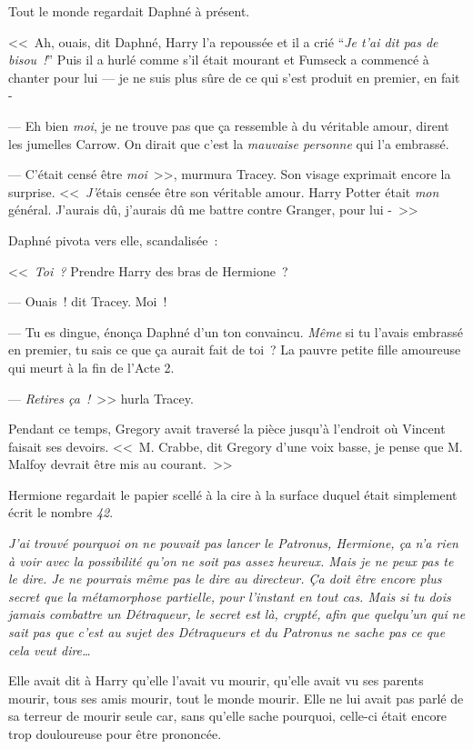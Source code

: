 Tout le monde regardait Daphné à présent.

<<~Ah, ouais, dit Daphné, Harry l'a repoussée et il a crié “\emph{Je t'ai dit pas de bisou~!}” Puis il a hurlé comme s'il était mourant et Fumseck a commencé à chanter pour lui — je ne suis plus sûre de ce qui s'est produit en premier, en fait -

--- Eh bien \emph{moi}, je ne trouve pas que ça ressemble à du véritable amour, dirent les jumelles Carrow. On dirait que c'est la \emph{mauvaise personne} qui l'a embrassé.

--- C'était censé être \emph{moi}~>>, murmura Tracey. Son visage exprimait encore la surprise. <<~\emph{J'}étais censée être son véritable amour. Harry Potter était \emph{mon} général. J'aurais dû, j'aurais dû me battre contre Granger, pour lui -~>>

Daphné pivota vers elle, scandalisée~:

<<~\emph{Toi~?} Prendre Harry des bras de Hermione~?

--- Ouais~! dit Tracey. Moi~!

--- Tu es dingue, énonça Daphné d'un ton convaincu. \emph{Même} si tu l'avais embrassé en premier, tu sais ce que ça aurait fait de toi~? La pauvre petite fille amoureuse qui meurt à la fin de l'Acte 2.

--- \emph{Retires ça~!}~>> hurla Tracey.

Pendant ce temps, Gregory avait traversé la pièce jusqu'à l'endroit où Vincent faisait ses devoirs. <<~M. Crabbe, dit Gregory d'une voix basse, je pense que M. Malfoy devrait être mis au courant.~>>


Hermione regardait le papier scellé à la cire à la surface duquel était simplement écrit le nombre \emph{42}.

\emph{J'ai trouvé pourquoi on ne pouvait pas lancer le Patronus, Hermione, ça n'a rien à voir avec la possibilité qu'on ne soit pas assez heureux. Mais je ne peux pas te le dire. Je ne pourrais même pas le dire au directeur. Ça doit être encore plus secret que la métamorphose partielle, pour l'instant en tout cas. Mais si tu dois jamais combattre un Détraqueur, le secret est là, crypté, afin que quelqu'un qui ne sait pas que c'est au sujet des Détraqueurs et du Patronus ne sache pas ce que cela veut dire…}

Elle avait dit à Harry qu'elle l'avait vu mourir, qu'elle avait vu ses parents mourir, tous ses amis mourir, tout le monde mourir. Elle ne lui avait pas parlé de sa terreur de mourir seule car, sans qu'elle sache pourquoi, celle-ci était encore trop douloureuse pour être prononcée.

